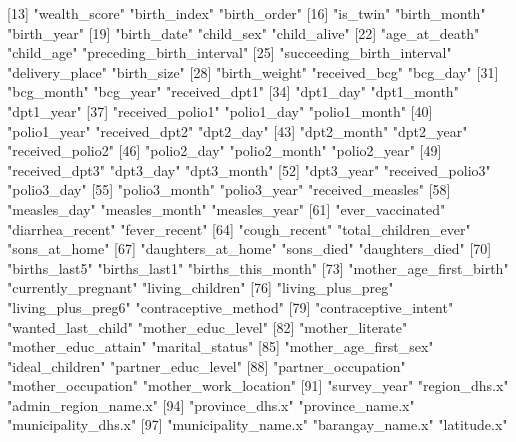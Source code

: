 [13] "wealth_score"              "birth_index"               "birth_order"              
 [16] "is_twin"                   "birth_month"               "birth_year"               
 [19] "birth_date"                "child_sex"                 "child_alive"              
 [22] "age_at_death"              "child_age"                 "preceding_birth_interval" 
 [25] "succeeding_birth_interval" "delivery_place"            "birth_size"               
 [28] "birth_weight"              "received_bcg"              "bcg_day"                  
 [31] "bcg_month"                 "bcg_year"                  "received_dpt1"            
 [34] "dpt1_day"                  "dpt1_month"                "dpt1_year"                
 [37] "received_polio1"           "polio1_day"                "polio1_month"             
 [40] "polio1_year"               "received_dpt2"             "dpt2_day"                 
 [43] "dpt2_month"                "dpt2_year"                 "received_polio2"          
 [46] "polio2_day"                "polio2_month"              "polio2_year"              
 [49] "received_dpt3"             "dpt3_day"                  "dpt3_month"               
 [52] "dpt3_year"                 "received_polio3"           "polio3_day"               
 [55] "polio3_month"              "polio3_year"               "received_measles"         
 [58] "measles_day"               "measles_month"             "measles_year"             
 [61] "ever_vaccinated"           "diarrhea_recent"           "fever_recent"             
 [64] "cough_recent"              "total_children_ever"       "sons_at_home"             
 [67] "daughters_at_home"         "sons_died"                 "daughters_died"           
 [70] "births_last5"              "births_last1"              "births_this_month"        
 [73] "mother_age_first_birth"    "currently_pregnant"        "living_children"          
 [76] "living_plus_preg"          "living_plus_preg6"         "contraceptive_method"     
 [79] "contraceptive_intent"      "wanted_last_child"         "mother_educ_level"        
 [82] "mother_literate"           "mother_educ_attain"        "marital_status"           
 [85] "mother_age_first_sex"      "ideal_children"            "partner_educ_level"       
 [88] "partner_occupation"        "mother_occupation"         "mother_work_location"     
 [91] "survey_year"               "region_dhs.x"              "admin_region_name.x"      
 [94] "province_dhs.x"            "province_name.x"           "municipality_dhs.x"       
 [97] "municipality_name.x"       "barangay_name.x"           "latitude.x"               

